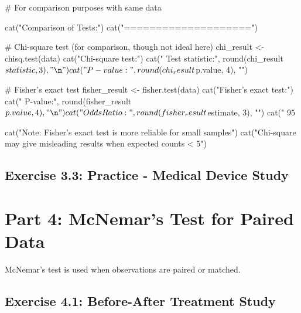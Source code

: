 \documentclass[11pt]{article}
\begin{document}
\begin{rcode}
# For comparison purposes with same data

cat("Comparison of Tests:\n")
cat("====================\n\n")

# Chi-square test (for comparison, though not ideal here)
chi_result <- chisq.test(data)
cat("Chi-square test:\n")
cat("  Test statistic:", round(chi_result$statistic, 3), "\n")
cat("  P-value:", round(chi_result$p.value, 4), "\n\n")

# Fisher's exact test
fisher_result <- fisher.test(data)
cat("Fisher's exact test:\n")
cat("  P-value:", round(fisher_result$p.value, 4), "\n")
cat("  Odds Ratio:", round(fisher_result$estimate, 3), "\n")
cat("  95%

cat("Note: Fisher's exact test is more reliable for small samples\n")
cat("Chi-square may give misleading results when expected counts < 5\n")
\end{rcode}

\subsection{Exercise 3.3: Practice - Medical Device Study}


\section{Part 4: McNemar's Test for Paired Data}

McNemar's test is used when observations are paired or matched.

\subsection{Exercise 4.1: Before-After Treatment Study}
\end{document}
